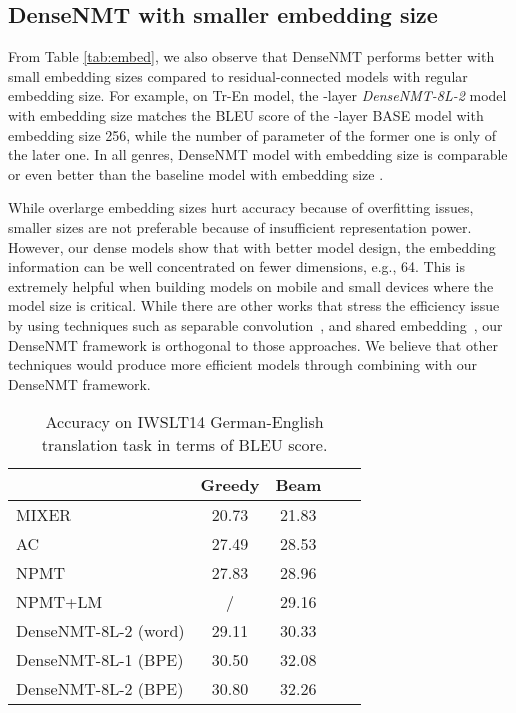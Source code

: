 \documentclass[11pt,a4paper]{article}
\begin{document}
\subsection{DenseNMT with smaller embedding size}
From Table \ref{tab:embed}, we also observe that DenseNMT performs better with small embedding sizes compared to residual-connected models with regular embedding size. For example, on Tr-En model,  the -layer \emph{DenseNMT-8L-2} model with embedding size  matches the BLEU score of the -layer BASE model with embedding size 256, while the number of parameter  of the former one is only   of the later one. 
In all genres, DenseNMT model with embedding size  is comparable or even better than the baseline model with embedding size . 

While overlarge embedding sizes hurt accuracy because of overfitting issues, smaller sizes are not preferable because of insufficient representation power. However, our dense models show that with better model design, the embedding information can be well concentrated on fewer dimensions, e.g., 64. This is extremely helpful when building models on mobile and small devices where the model size is critical. While there are other works that stress the efficiency issue by using techniques such as separable convolution~\cite{slicenet}, and shared embedding~\cite{transformer}, our DenseNMT framework is orthogonal to those approaches. 
We believe that other techniques would produce more efficient models through combining with our DenseNMT framework. 

\begin{table}[htbp]
\small
\centering
\captionsetup{font=small}
\begin{tabular}{lcccc}
\toprule
 & \textbf{Greedy} & \textbf{Beam}\\
\midrule
MIXER~\cite{ranzato2015sequence} & 20.73 & 21.83  \\
AC~\cite{bahdanau2016actor} & 27.49& 28.53\\
NPMT~\cite{msrphrase} &27.83 & 28.96\\
NPMT+LM~\cite{msrphrase} & / & 29.16 \\
\midrule 
DenseNMT-8L-2 (word) & 29.11 & 30.33 \\
DenseNMT-8L-1 (BPE) &30.50  & 32.08 \\
DenseNMT-8L-2 (BPE)& 30.80 & 32.26 \\
\bottomrule
\end{tabular}
\caption{ Accuracy on IWSLT14 German-English translation task in terms of BLEU score.}
\label{tab:de-en}
\end{table}
\end{document}
